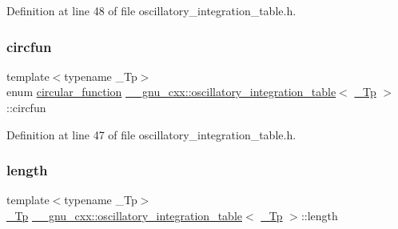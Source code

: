 Definition at line 48 of file oscillatory\+\_\+integration\+\_\+table.\+h.

\mbox{\label{struct____gnu__cxx_1_1oscillatory__integration__table_a21f86f96ca3654c18fa987f15bc14eaf}} 
\subsubsection{\texorpdfstring{circfun}{circfun}}
{\footnotesize\ttfamily template$<$typename \+\_\+\+Tp$>$ \\
enum \hyperlink{struct____gnu__cxx_1_1oscillatory__integration__table_aea06e472bb9ff6c535cfdc6a84b14e96}{circular\+\_\+function} \hyperlink{struct____gnu__cxx_1_1oscillatory__integration__table}{\+\_\+\+\_\+gnu\+\_\+cxx\+::oscillatory\+\_\+integration\+\_\+table}$<$ \hyperlink{namespace____gnu__cxx_a3b19a9c800ca194374ef9172290f7d79}{\+\_\+\+Tp} $>$\+::circfun}



Definition at line 47 of file oscillatory\+\_\+integration\+\_\+table.\+h.

\mbox{\label{struct____gnu__cxx_1_1oscillatory__integration__table_ad8654aa233b4878af8d9a99ed61db488}} 
\subsubsection{\texorpdfstring{length}{length}}
{\footnotesize\ttfamily template$<$typename \+\_\+\+Tp$>$ \\
\hyperlink{namespace____gnu__cxx_a3b19a9c800ca194374ef9172290f7d79}{\+\_\+\+Tp} \hyperlink{struct____gnu__cxx_1_1oscillatory__integration__table}{\+\_\+\+\_\+gnu\+\_\+cxx\+::oscillatory\+\_\+integration\+\_\+table}$<$ \hyperlink{namespace____gnu__cxx_a3b19a9c800ca194374ef9172290f7d79}{\+\_\+\+Tp} $>$\+::length}



